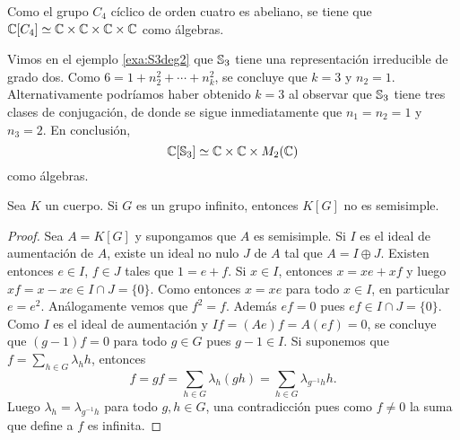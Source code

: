 \begin{example}
    Como el grupo $C_4$ cíclico de orden cuatro es abeliano, 
    se tiene que $\mathbb{C}[C_4]\simeq\mathbb{C}\times\mathbb{C}\times\mathbb{C}\times\mathbb{C}$ como álgebras. 
\end{example}

\begin{example}
    Vimos en el ejemplo \ref{exa:S3deg2} 
    que $\mathbb{S}_3$ tiene una representación irreducible de grado dos. Como
    $6=1+n_2^2+\cdots+n_k^2$, se concluye que $k=3$ y $n_2=1$. Alternativamente podríamos haber
    obtenido $k=3$ al observar que $\mathbb{S}_3$ tiene tres clases de conjugación, de donde se sigue
    inmediatamente que $n_1=n_2=1$ y $n_3=2$. En conclusión, 
    \[
    \mathbb{C}[\mathbb{S}_3]\simeq \mathbb{C}\times\mathbb{C}\times M_2(\mathbb{C})
    \]
    como álgebras. 
\end{example}

\begin{proposition}
	\label{pro:nunca_SS}
	Sea $K$ un cuerpo. 
	Si $G$ es un grupo infinito, entonces $K[G]$ no es semisimple.
\end{proposition}

\begin{proof}
	Sea $A=K[G]$ y supongamos que $A$ es semisimple.  Si $I$ es el ideal de
	aumentación de $A$, existe un ideal no nulo $J$ de $A$ tal que $A=I\oplus
	J$. Existen entonces $e\in I$, $f\in J$ tales que $1=e+f$. Si
	$x\in I$, entonces $x=xe+xf$ y luego $xf=x-xe\in I\cap J=\{0\}$. Como
	entonces $x=xe$ para todo $x\in I$, en particular $e=e^2$. Análogamente
	vemos que $f^2=f$. Además $ef=0$ pues $ef\in I\cap J=\{0\}$.  Como $I$
	es el ideal de aumentación y $If=(Ae)f=A(ef)=0$, se concluye que $(g-1)f=0$
	para todo $g\in G$ pues $g-1\in I$. Si suponemos que $f=\sum_{h\in
	G}\lambda_hh$, entonces 
	\[
	f=gf=\sum_{h\in G}\lambda_h(gh)=\sum_{h\in
	G}\lambda_{g^{-1}h}h.
	\]
	Luego $\lambda_h=\lambda_{g^{-1}h}$ para todo $g,h\in G$, una contradicción
	pues como $f\ne 0$ la suma que define a $f$ es infinita. 
\end{proof}
